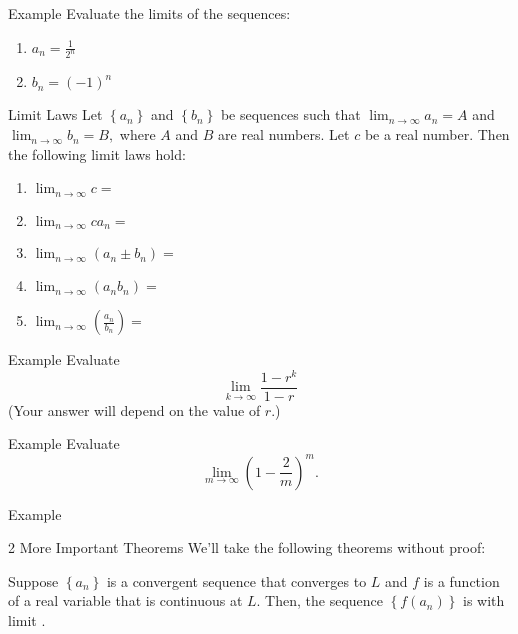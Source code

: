 \documentclass[presentation]{beamer}
\begin{document}
\begin{frame}[label={sec:orgfb8a629}]{Example}
Evaluate the limits of the sequences:
\begin{enumerate}
\item \(a_n = \frac{1}{2^n}\)
\item \(b_n = \left( -1 \right)^n\)
\end{enumerate}
\vspace{10in}
\end{frame}

\begin{frame}[label={sec:org9ec20de}]{Limit Laws}
Let \(\left\{ a_n \right\}\) and \(\left\{ b_n \right\}\) be sequences such that
\(\lim_{n\rightarrow \infty} a_n  = A\) and \(\lim_{n\rightarrow\infty} b_n = B,\)  where
\(A\) and \(B\) are real numbers.  Let \(c\) be a real number.  Then the following
limit laws hold:
\begin{enumerate}
\item \(\lim_{n\rightarrow \infty} c =\)
\item \(\lim_{n\rightarrow \infty}ca_n =\)
\item \(\lim_{n\rightarrow \infty} \left( a_n \pm b_n \right) =\)
\item \(\lim_{n\rightarrow \infty} (a_nb_n) =\)
\item \(\lim_{n\rightarrow \infty} \left( \frac{a_n}{b_n} \right) =\)
\end{enumerate}

\vspace{10in}
\end{frame}

\begin{frame}[label={sec:orgff3beef}]{Example}
Evaluate
\[\lim_{k\rightarrow \infty} \frac{1 - r^k}{1 - r} \]
(Your answer will depend on the value of \(r\).)
\vspace{10in}
\end{frame}

\begin{frame}[label={sec:org7b2678d}]{Example}
Evaluate
\[
   \lim_{m\rightarrow \infty} \left( 1 - \frac{2}{m} \right)^m.\]
\vspace{10in}
\end{frame}

\begin{frame}[label={sec:org98ebefb}]{Example}
\end{frame}

\begin{frame}[label={sec:orga405e5b}]{2 More Important Theorems}
We'll take the following theorems without proof:
\begin{theorem}
Suppose \(\left\{ a_n \right\}\) is a convergent sequence that
converges to \(L\) and \(f\) is a function of a real variable that is
continuous at \(L\).  Then, the sequence \(\left\{ f \left( a_n \right) \right\}\)
is \uline{\hspace*{1in}} with limit \uline{\hspace*{1in}}.
\end{theorem}
\end{frame}
\end{document}
